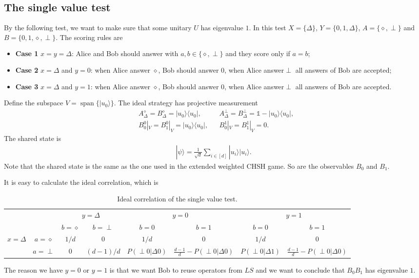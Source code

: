 \documentclass[11pt,letterpaper]{article}
\newcommand{\ket}[1]{|#1\rangle}
\newcommand{\ketbra}[2]{|#1\rangle\langle#2|}
\DeclareMathOperator{\spn}{span}
\newcommand{\1}{\mathbb{1}}
\newcommand{\LS}{LS}
\newcommand{\tri}{\Delta}
\newcommand{\pr}[2]{P(#1|#2)}
\theoremstyle{definition}
\begin{document}
\subsection{The single value test}
By the following test, we want to make sure that some unitary $U$ has eigenvalue $1$.
In this test $X = \{\tri \}$, $Y = \{0,1,\tri\}$, $A = \{\diamond, \perp\}$ and $B = \{0,1, \diamond, \perp\}$.
The scoring rules are
\begin{itemize}
	\item \textbf{Case 1} $x = y = \tri$: Alice and Bob should answer with $a, b \in \{\diamond, \perp\}$ and 
	they score only if $a = b$;
	\item \textbf{Case 2} $x =\tri$ and $y = 0$: when Alice answer $\diamond$, Bob should answer $0$, when 
	Alice answer$\perp$ all answers of Bob are accepted;
	\item \textbf{Case 3} $x = \tri$ and $y = 1$: when Alice answer $\diamond$, Bob should answer $0$, when 
	Alice answer$\perp$ all answers of Bob are accepted.
\end{itemize}

Define the subspace $V = \spn\{ \ket{u_0} \}$.
The ideal strategy has projective measurement 
\begin{align*}
&A_\tri^\diamond = B_\tri^\diamond= \ketbra{u_0}{u_0}, 
&&A_\tri^\perp = B_\tri^\perp = \1 - \ketbra{u_0}{u_0},\\
&B_0^0|_V = B_1^0|_V = \ketbra{u_0}{u_0}, 
&&B_0^1|_V = B_1^1|_V = 0.
\end{align*}
The shared state is 
\begin{align}
	\ket{\psi} = \frac{1}{\sqrt{d}} \sum_{i \in [d]} \ket{u_i}\ket{u_i}.
\end{align}
Note that the shared state is the same as the one used in the extended weighted CHSH game.
So are the observables $B_0$ and $B_1$.

It is easy to calculate the ideal correlation, which is
\begin{table}[H]
\begin{center}
\begin{tabular}{|c|c||c|c|c|c|c|c|}
\hline
\multicolumn{2}{|c|}{} &
\multicolumn{2}{|c|}{$y=\tri$} &
\multicolumn{2}{|c|}{$y=0$} &
\multicolumn{2}{|c|}{$y=1$}\\
\cline{3-8}
\multicolumn{2}{|c|}{} &$b = \diamond$ & $b = \perp$ & $b = 0$ & $b = 1$ & $b = 0$ & $b = 1$\\
\hline
\hline
\multirow{2}{*}{$x = \tri$} & $a=\diamond$ & $1/d$ & 0 & $1/d$ & 0 & $1/d$ & 0 \\
\cline{2-8}
&$a=\perp$ & 0 & $(d-1)/d$ & \small $\pr{\perp0}{\tri0}$ & \small $\frac{d-1}{d} -\pr{\perp0}{\tri0}$  
& \small $\pr{\perp0}{\tri1}$ & \small $\frac{d-1}{d}- \pr{\perp0}{\tri0}$  \\
\hline
\end{tabular}
\caption{Ideal correlation of the single value test.}
\end{center}
\end{table}
The reason we have $y=0$ or $y=1$ is that we want Bob to reuse operators from $\LS$ and we want to
conclude that $B_0B_1$ has eigenvalue $1$.
\end{document}
